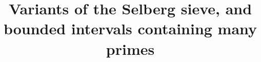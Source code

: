\documentclass{bmcart}
\theoremstyle{plain}
\theoremstyle{definition}
\begin{document}
\begin{frontmatter}

\begin{fmbox}


\title{Variants of the Selberg sieve, and bounded intervals containing many primes}


\author[
   addressref={aff1},                   %
   corref={aff1},                       %
   email={tao@math.ucla.edu}   %
]{ }


\address[id=aff1]{%
  ,                     %
}



\end{fmbox}
\end{frontmatter}
\end{document}
